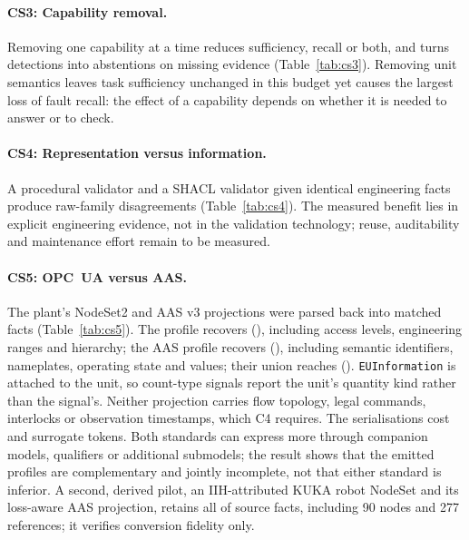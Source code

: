 \paragraph{CS3: Capability removal.} Removing one capability at a time reduces sufficiency,
recall or both, and turns detections into abstentions on missing evidence
(Table~\ref{tab:cs3}). Removing unit semantics leaves task sufficiency unchanged in this
budget yet causes the largest loss of fault recall: the effect of a capability depends on
whether it is needed to answer or to check.



\paragraph{CS4: Representation versus information.} A procedural validator and a SHACL
validator given identical engineering facts produce \CsDisagreements{} raw-family
disagreements (Table~\ref{tab:cs4}). The measured benefit lies in explicit engineering
evidence, not in the validation technology; reuse, auditability and maintenance effort
remain to be measured.



\paragraph{CS5: OPC~UA versus AAS.} The plant's \opcua{} NodeSet2 and AAS v3 projections
were parsed back into \CsFacts{} matched facts (Table~\ref{tab:cs5}). The \opcua{} profile
recovers \CsOpcuaFacts{} (\CsOpcuaPct{}), including access levels, engineering ranges and
hierarchy; the AAS profile recovers \CsAasFacts{} (\CsAasPct{}), including semantic
identifiers, nameplates, operating state and values; their union reaches \CsUnionFacts{}
(\CsUnionPct{}). \opcua{} \texttt{EUInformation} is attached to the unit, so
\CsQkConflicts{} count-type signals report the unit's quantity kind rather than the
signal's. Neither projection carries flow topology, legal commands, interlocks or
observation timestamps, which C4 requires. The serialisations cost \CsOpcuaTokens{} and
\CsAasTokens{} surrogate tokens. Both standards can express more through companion models,
qualifiers or additional submodels; the result shows that the emitted profiles are
complementary and jointly incomplete, not that either standard is inferior. A second,
derived pilot, an IIH-attributed KUKA robot NodeSet and its loss-aware AAS projection,
retains all \CsKukaRetained{} of \CsKukaFacts{} source facts, including 90 nodes and
277 references; it verifies conversion fidelity only.
